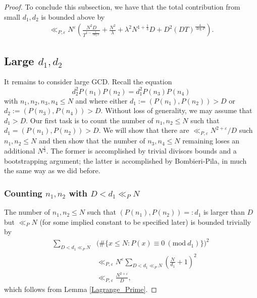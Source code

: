 \documentclass[11pts]{amsart}
\numberwithin{equation}{section}
\newcommand{\Mod}[1]{\ (\text{mod}\ #1)}
\begin{document}
\begin{proof}
To conclude this subsection, we have that the total contribution from small $d_1,d_2$ is bounded above by
\begin{align}
    \label{small_GCD_total}
    \ll_{P,\varepsilon}
    N^{\varepsilon}
        \left(\frac{N^2D}{T^{1-\frac{1}{\deg P}}}
                +\frac{N^2}{\lambda}
                +\lambda^2N^{1+\frac{1}{3}}D    
                +
                D^2(DT)^{\frac{4}{\deg P}}
                \right).
\end{align}





\subsection{Large $d_1,d_2$}


It remains to consider large GCD. Recall the equation
\begin{equation}
\label{mainEquation}
    d_2^2 P(n_1)P(n_2) = d_1^2 P(n_3)P(n_4) 
\end{equation}
with $n_1,n_2,n_3,n_4\leq N$ and where either $d_1:=(P(n_1),P(n_2))>D$ or $d_2:=(P(n_3),P(n_4))>D$. Without loss of generality, we may assume that $d_1>D$. Our first task is to count the number of $n_1,n_2\leq N$ such that $d_1=(P(n_1),P(n_2))>D$. We will show that there are $\ll_{P,\varepsilon}N^{2+\varepsilon}/D$ such $n_1,n_2\leq N$ and then show that the number of $n_3,n_4\leq N$ remaining loses an additional $N^{\frac{1}{3}}.$ The former is accomplished by trivial divisors bounds and a bootstrapping argument; the latter is accomplished by Bombieri-Pila, in much the same way as we did before. 


\subsubsection{Counting $n_1,n_2$ with $D<d_1\ll_P N$}
The number of $n_1,n_2\leq N$ such that $(P(n_1),P(n_2))=:d_1$ is larger than $D$ but $\ll_P N$ (for some implied constant to be specified later) is bounded trivially by
    \begin{align*}
        \sum_{D<d_1\ll_P N}&\Biggr(\#\{x\leq N: P(x)\equiv 0\Mod{d_1}\}\Biggr)^2\\
        &\ll_{P,\varepsilon}
        N^{\varepsilon}\sum_{D<d_1\ll_P N}\left(\frac{N}{d_1}+1\right)^2\\
        &\ll_{P,\varepsilon} \frac{N^{2+\varepsilon}}{D},
    \end{align*}
which follows from Lemma \ref{Lagrange_Prime}.


\end{proof}
\end{document}
